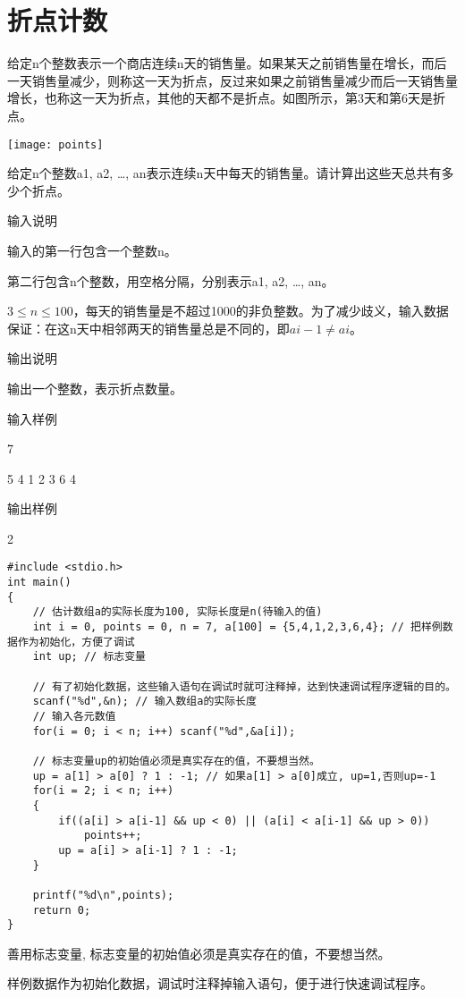 \section{折点计数}	
给定n个整数表示一个商店连续n天的销售量。如果某天之前销售量在增长，而后一天销售量减少，则称这一天为折点，反过来如果之前销售量减少而后一天销售量增长，也称这一天为折点，其他的天都不是折点。如图所示，第3天和第6天是折点。

\texttt{[image: points]}

给定n个整数a1, a2, \dots, an表示连续n天中每天的销售量。请计算出这些天总共有多少个折点。

输入说明
	
输入的第一行包含一个整数n。

第二行包含n个整数，用空格分隔，分别表示a1, a2, \dots, an。

$3\le n\le 100$，每天的销售量是不超过1000的非负整数。为了减少歧义，输入数据保证：在这n天中相邻两天的销售量总是不同的，即$ai-1\ne ai$。

输出说明	

输出一个整数，表示折点数量。

输入样例	

7

5 4 1 2 3 6 4

输出样例
	
2

\begin{lstlisting}
#include <stdio.h>
int main()
{
    // 估计数组a的实际长度为100, 实际长度是n(待输入的值)
	int i = 0, points = 0, n = 7, a[100] = {5,4,1,2,3,6,4}; // 把样例数据作为初始化，方便了调试
	int up; // 标志变量 
	
	// 有了初始化数据，这些输入语句在调试时就可注释掉，达到快速调试程序逻辑的目的。
	scanf("%d",&n); // 输入数组a的实际长度
	// 输入各元数值
	for(i = 0; i < n; i++) scanf("%d",&a[i]);
	
	// 标志变量up的初始值必须是真实存在的值，不要想当然。
	up = a[1] > a[0] ? 1 : -1; // 如果a[1] > a[0]成立, up=1,否则up=-1
	for(i = 2; i < n; i++)
	{
		if((a[i] > a[i-1] && up < 0) || (a[i] < a[i-1] && up > 0))
			points++;
		up = a[i] > a[i-1] ? 1 : -1;
	}
	
	printf("%d\n",points);
	return 0;
} 
\end{lstlisting}

\begin{note}[要点]
	善用标志变量, 标志变量的初始值必须是真实存在的值，不要想当然。
	
	样例数据作为初始化数据，调试时注释掉输入语句，便于进行快速调试程序。
\end{note}
